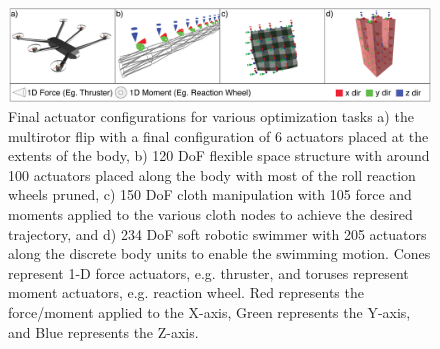 
\begin{figure}
    \centering
    \includegraphics[width=\linewidth]{figures/Figure_5_final_solutions.eps}
    \caption{{Final actuator configurations for various optimization tasks a) the multirotor flip with a final configuration of 6 actuators placed at the extents of the body, b) 120 DoF flexible space structure with around 100 actuators placed along the body with most of the roll reaction wheels pruned, c) 150 DoF cloth manipulation with 105 force and moments applied to the various cloth nodes to achieve the desired trajectory, and d) 234 DoF soft robotic swimmer with 205 actuators along the discrete body units to enable the swimming motion. Cones represent 1-D force actuators, e.g. thruster, and toruses represent moment actuators, e.g. reaction wheel. Red represents the force/moment applied to the X-axis, Green represents the Y-axis, and Blue represents the Z-axis.}  }\label{fig:final_actuator_configuration}
\end{figure}


